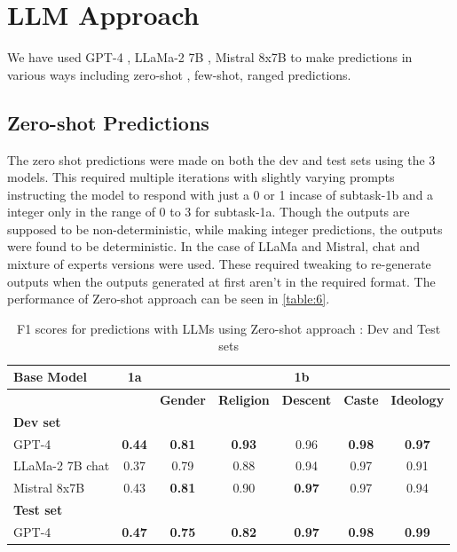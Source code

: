 \documentclass[10pt, a4paper]{article}
\begin{document}
\section{LLM Approach}

We have used GPT-4 \citep{openai2024gpt4}, LLaMa-2 7B \citep{touvron2023llama}, Mistral 8x7B \citep{jiang2023mistral} to make predictions in various ways including zero-shot , few-shot, ranged predictions.

\subsection{Zero-shot Predictions}
The zero shot predictions were made on both the dev and test sets using the 3 models. This required multiple iterations with slightly varying prompts instructing the model to respond with just a 0 or 1 incase of subtask-1b and a integer only in the range  of 0 to 3 for subtask-1a. Though the outputs are supposed to be non-deterministic, while making integer predictions, the outputs were found to be deterministic. In the case of LLaMa and Mistral, chat and mixture of experts versions were used. These required tweaking to re-generate outputs when the outputs generated at first aren't in the required format. The performance of Zero-shot approach can be seen in \autoref{table:6}.

\begin{table}[h!]
\begin{center}
\begin{tabular}{|l|c|c|c|c|c|c|}
\hline
\textbf{Base Model} & \textbf{1a} & \multicolumn{5}{c|}{\textbf{1b}} \\
\hline
 & & \textbf{Gender} & \textbf{Religion} & \textbf{Descent} & \textbf{Caste} & \textbf{Ideology} \\
\hline
\textbf{Dev set} & \multicolumn{6}{c|}{\textbf{}} \\
\hline
GPT-4 & \textbf{0.44} & \textbf{0.81} & \textbf{0.93} & 0.96 & \textbf{0.98} & \textbf{0.97} \\
\hline
LLaMa-2 7B chat & 0.37 & 0.79 & 0.88 & 0.94 & 0.97 & 0.91 \\
\hline
Mistral 8x7B & 0.43 & \textbf{0.81} & 0.90 & \textbf{0.97} & 0.97 & 0.94 \\
\hline
\textbf{Test set} & \multicolumn{6}{c|}{\textbf{}} \\
\hline
GPT-4 & \textbf{0.47} & \textbf{0.75} & \textbf{0.82} & \textbf{0.97} & \textbf{0.98} & \textbf{0.99} \\
\hline
\end{tabular}
\caption{F1 scores for predictions with LLMs using Zero-shot approach : Dev and Test sets}
\label{table:6}
\end{center}
\end{table}
\end{document}
